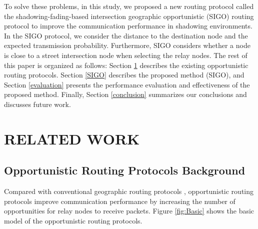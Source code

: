 \documentclass[conference]{IEEEtran}
\begin{document}
To solve these problems, in this study, we proposed a new routing protocol called the shadowing-fading-based intersection geographic opportunistic (SIGO) routing protocol to improve the communication performance in shadowing environments. In the SIGO protocol, we consider the distance to the destination node and the expected transmission probability. Furthermore, SIGO considers whether a node is close to a street intersection node when selecting the relay nodes.  The rest of this paper is organized as follows:
Section \ref{relatedSection} describes the existing opportunistic routing protocols.
Section \ref{SIGO} describes the proposed method (SIGO), and Section \ref{evaluation} presents the performance evaluation and effectiveness of the proposed method. Finally, Section \ref{conclusion} summarizes our conclusions and discusses future work.





\section{RELATED WORK} %
\label{relatedSection}

\subsection{Opportunistic Routing Protocols Background}

Compared with conventional geographic routing protocols \cite{6}, opportunistic routing protocols improve communication performance by increasing the number of opportunities for relay nodes to receive packets. Figure \ref{fig:Basic} shows the basic model of the opportunistic routing protocols.
\end{document}
